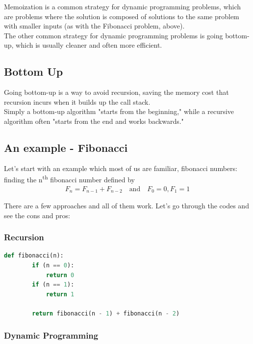 \documentclass[12pt]{article}
\begin{document}
    Memoization is a common strategy for dynamic programming problems, which are problems where the solution is composed of solutions to the same problem with smaller inputs (as with the Fibonacci problem, above). \\The other common strategy for dynamic programming problems is going bottom-up, which is usually cleaner and often more efficient.
    	
	\subsection{Bottom Up}
	Going bottom-up is a way to avoid recursion, saving the memory cost that recursion incurs when it builds up the call stack.\\

    Simply a bottom-up algorithm "starts from the beginning," while a recursive algorithm often "starts from the end and works backwards."
	
	\subsection{An example - Fibonacci}
	Let's start with an example which most of us are familiar, fibonacci numbers: finding the n\textsuperscript{th} fibonacci number defined by\\
    \begin{align*}
    F_n = F_{n-1} + F_{n-2} \quad \textrm{and} \quad F_0 = 0,   F_1 = 1
    \end{align*}
    
    There are a few approaches and all of them work. Let's go through the codes and see the cons and pros:
	\subsubsection{Recursion}
	
    \begin{lstlisting}[language=Python]
    def fibonacci(n):
        if (n == 0):
            return 0
        if (n == 1):
            return 1
    
        return fibonacci(n - 1) + fibonacci(n - 2)
    \end{lstlisting}

	\subsubsection{Dynamic Programming}
        
\end{document}
